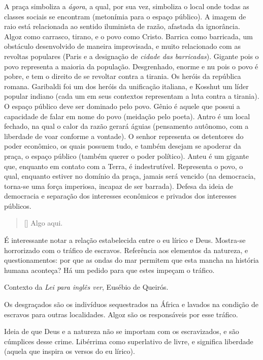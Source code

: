 A praça simboliza a \textit{ágora}, a qual, por sua vez, simboliza o local onde todas as classes sociais se encontram (metonímia para o espaço público). A imagem de raio está relacionada ao sentido iluminista de razão, afastada da ignorância. Algoz como carrasco, tirano, e o povo como Cristo. Barrica como barricada, um obstáculo desenvolvido de maneira improvisada, e muito relacionado com as revoltas populares (Paris e a designação de \textit{cidade das barricadas}). Gigante pois o povo representa a maioria da população. Desgrenhado, enorme e nu pois o povo é pobre, e tem o direito de se revoltar contra a tirania. Os heróis da república romana. Garibaldi foi um dos heróis da unificação italiana, e Kosshut um líder popular indiano (cada um em seus contextos representam a luta contra a tirania). O espaço público deve ser dominado pelo povo. Gênio é aquele que possui a capacidade de falar em nome do povo (meidação pelo poeta). Antro é um local fechado, na qual o calor da razão gerará águias (pensamento autônomo, com a liberdade de voar conforme a vontade). O senhor representa os detentores do poder econômico, os quais possuem tudo, e também desejam se apoderar da praça, o espaço público (também querer o poder político). Anteu é um gigante que, enquanto em contato com a Terra, é indestrutível. Representa o povo, o qual, enquanto estiver no domínio da praça, jamais será vencido (na democracia, torna-se uma força imperiosa, incapaz de ser barrada). Defesa da ideia de democracia e separação dos interesses econômicos e privados dos interesses públicos.

\begin{verse}[\versewidth]
Algo aqui.
\end{verse}

É interessante notar a relação estabelecida entre o eu lírico e Deus. Mostra-se horrorizado com o tráfico de escravos. Referência aos elementos da natureza, e questionamentos: por que as ondas do mar permitem que esta mancha na história humana aconteça? Há um pedido para que estes impeçam o tráfico.

Contexto da \textit{Lei para inglês ver}, Eusébio de Queirós.

Os desgraçados são os indivíduos sequestrados na África e lavados na condição de escravos para outras localidades. Algoz são os responsáveis por esse tráfico.

Ideia de que Deus e a natureza não se importam com os escravizados, e são cúmplices desse crime. Libérrima como superlativo de livre, e significa liberdade (aquela que inspira os versos do eu lírico).

